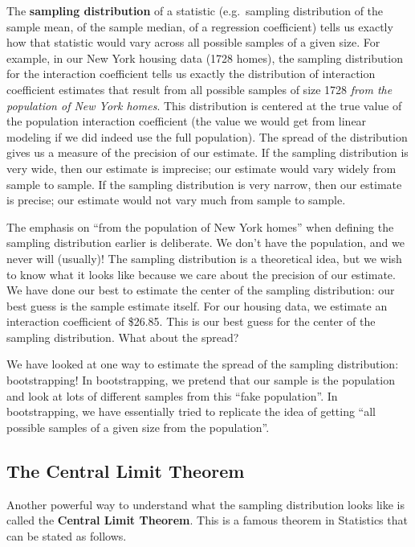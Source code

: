 \documentclass[
]{book}
\begin{document}
The \textbf{sampling distribution} of a statistic (e.g.~sampling distribution of the sample mean, of the sample median, of a regression coefficient) tells us exactly how that statistic would vary across all possible samples of a given size. For example, in our New York housing data (1728 homes), the sampling distribution for the interaction coefficient tells us exactly the distribution of interaction coefficient estimates that result from all possible samples of size 1728 \emph{from the population of New York homes}. This distribution is centered at the true value of the population interaction coefficient (the value we would get from linear modeling if we did indeed use the full population). The spread of the distribution gives us a measure of the precision of our estimate. If the sampling distribution is very wide, then our estimate is imprecise; our estimate would vary widely from sample to sample. If the sampling distribution is very narrow, then our estimate is precise; our estimate would not vary much from sample to sample.

The emphasis on ``from the population of New York homes'' when defining the sampling distribution earlier is deliberate. We don't have the population, and we never will (usually)! The sampling distribution is a theoretical idea, but we wish to know what it looks like because we care about the precision of our estimate. We have done our best to estimate the center of the sampling distribution: our best guess is the sample estimate itself. For our housing data, we estimate an interaction coefficient of \$26.85. This is our best guess for the center of the sampling distribution. What about the spread?

We have looked at one way to estimate the spread of the sampling distribution: bootstrapping! In bootstrapping, we pretend that our sample is the population and look at lots of different samples from this ``fake population''. In bootstrapping, we have essentially tried to replicate the idea of getting ``all possible samples of a given size from the population''.

\hypertarget{the-central-limit-theorem}{%
\subsection{The Central Limit Theorem}\label{the-central-limit-theorem}}

Another powerful way to understand what the sampling distribution looks like is called the \textbf{Central Limit Theorem}. This is a famous theorem in Statistics that can be stated as follows.
\end{document}
